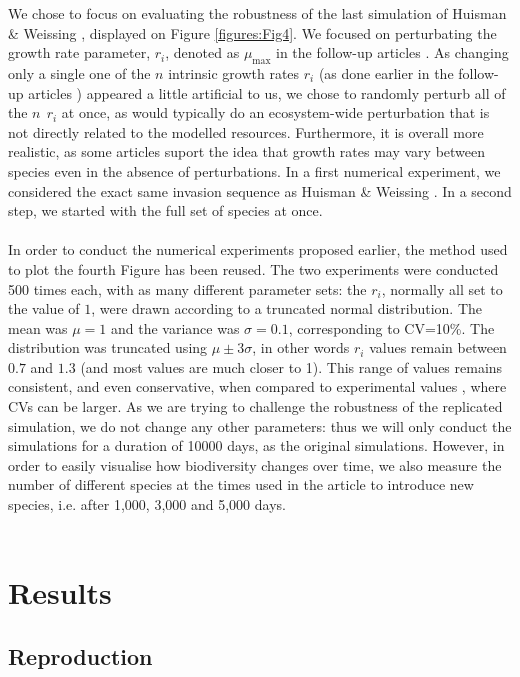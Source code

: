 We chose to focus on evaluating the robustness of the last simulation of Huisman \& Weissing \cite{1999:Huisman}, displayed on Figure \ref{figures:Fig4}. We focused on perturbating the growth rate parameter, $r_i$, denoted as $\mu_{\text{max}}$ in the follow-up articles \cite{2001:Schippers, 2001:Huisman}. As changing only a single one of the $n$ intrinsic growth rates $r_i$ (as done earlier in the follow-up articles \cite{2001:Schippers, 2001:Huisman}) appeared a little artificial to us, we chose to randomly perturb all of the $n~~r_i$ at once, as would typically do an ecosystem-wide perturbation that is not directly related to the modelled resources. Furthermore, it is overall more realistic, as some articles \cite{2015:Edwards} suport the idea that growth rates may vary between species even in the absence of perturbations. In a first numerical experiment, we considered the exact same invasion sequence as Huisman \& Weissing \cite{1999:Huisman}.  In a second step, we started with the full set of species at once.\\
\\
In order to conduct the numerical experiments proposed earlier, the method used to plot the fourth Figure has been reused. The two experiments were conducted 500 times each, with as many different parameter sets: the $r_i$, normally all set to the value of $1$, were drawn according to a truncated normal distribution. The mean was $\mu=1$ and the variance was $\sigma=0.1$, corresponding to CV=10\%. The distribution was truncated using $\mu\pm3\sigma$, in other words $r_i$ values remain between $0.7$ and $1.3$ (and most values are much closer to 1). This range of values remains consistent, and even conservative, when compared to experimental values \cite{2015:Edwards}, where CVs can be larger. As we are trying to challenge the robustness of the replicated simulation, we do not change any other parameters: thus we will only conduct the simulations for a duration of 10000 days, as the original simulations. However, in order to easily visualise how biodiversity changes over time, we also measure the number of different species at the times used in the article to introduce new species, i.e. after 1,000, 3,000 and 5,000 days.\\~\\ 

\section{Results}

\subsection{Reproduction}


